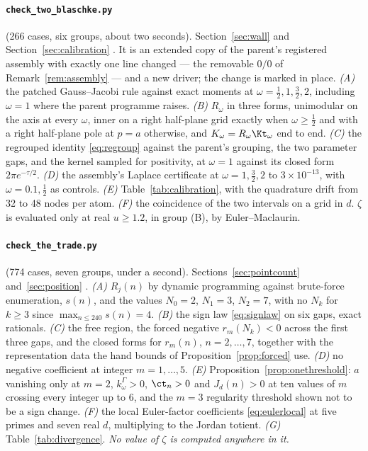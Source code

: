 \paragraph{\texttt{check\_two\_blaschke.py}} (266 cases, six groups, about two
seconds). Section~\ref{sec:wall} and Section~\ref{sec:calibration}
\cite{WallNote}. It is an extended copy of the parent's registered assembly
\cite[App.~A]{Markov} with exactly one line changed --- the removable $0/0$ of
Remark~\ref{rem:assembly} --- and a new driver; the change is marked in place.
\emph{(A)} the patched Gauss--Jacobi rule against exact moments at
$\omega=\frac12,1,\frac32,2$, including $\omega=1$ where the parent programme
raises. \emph{(B)} $R_\omega$ in three forms, unimodular on the axis at every
$\omega$, inner on a right half-plane grid exactly when $\omega\ge\frac12$ and
with a right half-plane pole at $p=a$ otherwise, and $K_\omega=R_\omega\Kt_\omega$
end to end. \emph{(C)} the regrouped identity \eqref{eq:regroup} against the
parent's grouping, the two parameter gaps, and the kernel sampled for positivity,
at $\omega=1$ against its closed form $2\pi e^{-\tau/2}$. \emph{(D)} the assembly's
Laplace certificate at $\omega=1,\frac32,2$ to $3\times10^{-13}$, with
$\omega=0.1,\frac12$ as controls. \emph{(E)} Table~\ref{tab:calibration}, with
the quadrature drift from 32 to 48 nodes per atom. \emph{(F)} the coincidence of
the two intervals on a grid in $d$. $\zeta$ is evaluated only at real
$u\ge1.2$, in group (B), by Euler--Maclaurin.

\paragraph{\texttt{check\_the\_trade.py}} (774 cases, seven groups, under a
second). Sections~\ref{sec:pointcount} and~\ref{sec:position} \cite{TradeNote}.
\emph{(A)} $R_j(n)$ by dynamic programming against brute-force enumeration,
$s(n)$, and the values $N_0=2$, $N_1=3$, $N_2=7$, with no $N_k$ for $k\ge3$
since $\max_{n\le240}s(n)=4$. \emph{(B)} the sign law \eqref{eq:signlaw} on six gaps,
exact rationals. \emph{(C)} the free region, the forced negative $r_m(N_k)<0$
across the first three gaps, and the closed forms for $r_m(n)$, $n=2,\dots,7$,
together with the representation data the hand bounds of
Proposition~\ref{prop:forced} use. \emph{(D)} no negative coefficient at integer
$m=1,\dots,5$. \emph{(E)} Proposition~\ref{prop:onethreshold}: $a$ vanishing only
at $m=2$, $k^\Gamma_\omega>0$, $\ct_n>0$ and $J_d(n)>0$ at ten values of $m$
crossing every integer up to $6$, and the $m=3$ regularity threshold shown not to
be a sign change. \emph{(F)} the local Euler-factor coefficients
\eqref{eq:eulerlocal} at five primes and seven real $d$, multiplying to the
Jordan totient. \emph{(G)} Table~\ref{tab:divergence}. \emph{No value of $\zeta$
is computed anywhere in it.}

